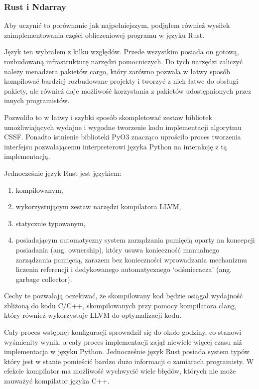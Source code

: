 \documentclass[11pt, a4paper]{article}
\begin{document}
\begin{sloppypar}
    \subsubsection{Rust i Ndarray}
    Aby uczynić to porównanie jak najpełniejszym, podjąłem również wysiłek
    zaimplementowania części obliczeniowej programu w języku Rust.

    Język ten wybrałem z kilku względów. Przede wszystkim posiada on gotową, rozbudowaną
    infrastrukturę narzędzi pomocniczych. Do tych narzędzi zaliczyć należy menadżera pakietów
    cargo, który zarówno pozwala w łatwy sposób kompilować bardziej rozbudowane projekty
    i tworzyć z nich łatwe do obsługi pakiety, ale również daje możliwość korzystania z pakietów
    udostępnionych przez innych programistów.

    Pozwoliło to w łatwy i szybki sposób skompletować zestaw bibliotek umożliwiających wydajne
    i wygodne tworzenie kodu implementacji algorytmu CSSF. Ponadto istnienie biblioteki
    PyO3 znacząco uprościło proces tworzenia interfejsu pozwalającemu interpreterowi
    języka Python na interakcję z tą implementacją.

    Jednocześnie język Rust jest językiem:
    \begin{enumerate}
      \item kompilowanym,

      \item wykorzystującym zestaw narzędzi kompilatora LLVM,

      \item statycznie typowanym,

      \item posiadającym automatyczny system zarządzania pamięcią oparty na koncepcji posiadania
        (ang. ownership), który usuwa konieczność manualnego zarządzania pamięcią,
        zarazem bez konieczności wprowadzania mechanizmu liczenia referencji i
        dedykowanego automatycznego `odśmiecacza' (ang. garbage collector).
    \end{enumerate}

    Cechy te pozwalają oczekiwać, że skompilowany kod będzie osiągał wydajność zbliżoną do
    kodu C/C++, skompilowanych przy pomocy kompilatora clang, który również wykorzystuje
    LLVM do optymalizacji kodu.

    Cały proces wstępnej konfiguracji sprowadził się do około godziny, co stanowi
    wyśmienity wynik, a cały proces implementacji zajął niewiele więcej czasu niż implementacja
    w języku Python. Jednocześnie język Rust posiada system typów który jest w stanie
    pomieścić bardzo dużo informacji o zamiarach programisty. W efekcie kompilator ma możliwość
    wychwycić wiele błędów, których nie może zauważyć kompilator języka C++.


\end{sloppypar}
\end{document}
